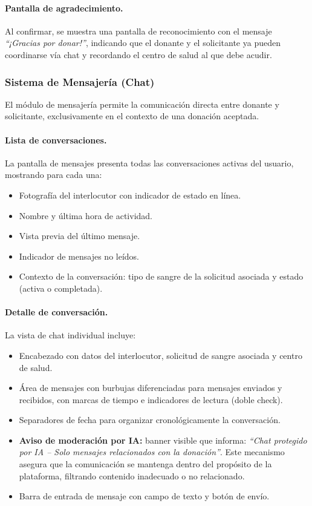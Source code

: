 \documentclass[12pt, a4paper]{article}
\begin{document}
\paragraph{Pantalla de agradecimiento.}
Al confirmar, se muestra una pantalla de reconocimiento con el mensaje \textit{``¡Gracias por donar!''}, indicando que el donante y el solicitante ya pueden coordinarse vía chat y recordando el centro de salud al que debe acudir.

\subsubsection{Sistema de Mensajería (Chat)}

El módulo de mensajería permite la comunicación directa entre donante y solicitante, exclusivamente en el contexto de una donación aceptada.

\paragraph{Lista de conversaciones.}
La pantalla de mensajes presenta todas las conversaciones activas del usuario, mostrando para cada una:
\begin{itemize}
    \item Fotografía del interlocutor con indicador de estado en línea.
    \item Nombre y última hora de actividad.
    \item Vista previa del último mensaje.
    \item Indicador de mensajes no leídos.
    \item Contexto de la conversación: tipo de sangre de la solicitud asociada y estado (activa o completada).
\end{itemize}

\paragraph{Detalle de conversación.}
La vista de chat individual incluye:
\begin{itemize}
    \item Encabezado con datos del interlocutor, solicitud de sangre asociada y centro de salud.
    \item Área de mensajes con burbujas diferenciadas para mensajes enviados y recibidos, con marcas de tiempo e indicadores de lectura (doble check).
    \item Separadores de fecha para organizar cronológicamente la conversación.
    \item \textbf{Aviso de moderación por IA:} banner visible que informa: \textit{``Chat protegido por IA -- Solo mensajes relacionados con la donación''}. Este mecanismo asegura que la comunicación se mantenga dentro del propósito de la plataforma, filtrando contenido inadecuado o no relacionado.
    \item Barra de entrada de mensaje con campo de texto y botón de envío.
\end{itemize}
\end{document}
